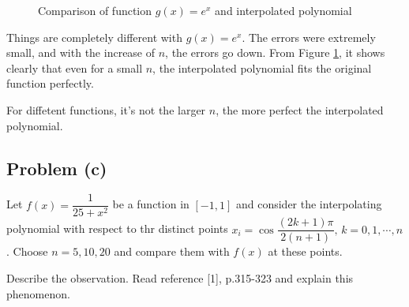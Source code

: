 \documentclass[UTF8,hyperref]{article}
\begin{document}
\begin{figure}[htbp]
{        \label{Fig2.c}
    }
    \caption{Comparison of function $g(x)=e^x$ and interpolated polynomial}
    \label{Fig2}
\end{figure}
\par Things are completely different with $g(x)=e^x$. The errors were extremely small, and with the increase of $n$, the errors go down. From Figure \ref{Fig2}, it shows clearly that even for a small $n$, the interpolated polynomial fits the original function perfectly.
\par For diffetent functions, it's not the larger $n$, the more perfect the interpolated polynomial.

\subsection{Problem (c)}

\par Let $f(x)=\dfrac{1}{25+x^2}$ be a function in $[-1,1]$ and consider the interpolating polynomial with respect to thr distinct points $x_i=\cos{\dfrac{(2k+1)\pi}{2(n+1)}},\, k=0,1,\cdots,n$. Choose $n=5,10,20$ and compare them with $f(x)$ at these points.

\par Describe the observation. Read reference [1], p.315-323 and explain this phenomenon.
\end{document}
